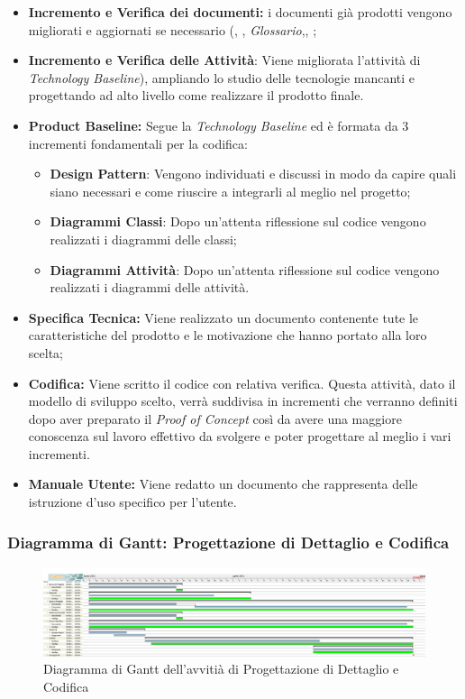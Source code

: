 \begin{itemize}
    \item \textbf{Incremento e Verifica dei documenti:} i documenti già prodotti vengono migliorati e aggiornati se necessario (\textit{\NdP}, \textit{\PdP}, \textit{Glossario},\textit{\PdQ}, \textit{\AdR}; 
    \item \textbf{Incremento e Verifica delle Attività}: Viene migliorata l'attività di \textit{Technology Baseline}), ampliando lo studio delle tecnologie mancanti e progettando ad alto livello come realizzare il prodotto finale.
    \item \textbf{Product Baseline:} Segue la \textit{Technology Baseline} ed è formata da 3 incrementi fondamentali per la codifica:
        \begin{itemize}
            \item \textbf{Design Pattern}: Vengono individuati e discussi in modo da capire quali siano necessari e come riuscire a integrarli al meglio nel progetto;
            \item \textbf{Diagrammi Classi}: Dopo un'attenta riflessione sul codice vengono realizzati i diagrammi delle classi;
            \item \textbf{Diagrammi Attività}: Dopo un'attenta riflessione sul codice vengono realizzati i diagrammi delle attività. 
        \end{itemize} 
    \item \textbf{Specifica Tecnica:} Viene realizzato un documento contenente tute le caratteristiche del prodotto e le motivazione che hanno portato alla loro scelta;
    \item \textbf{Codifica:} Viene scritto il codice con relativa verifica. Questa attività, dato il modello di sviluppo scelto, verrà suddivisa in incrementi che verranno definiti dopo aver preparato il \textit{Proof of Concept} così da avere una maggiore conoscenza sul lavoro effettivo da svolgere e poter progettare al meglio i vari incrementi.  
    \item \textbf{Manuale Utente:} Viene redatto un documento che rappresenta delle istruzione d'uso specifico per l'utente.
\end{itemize}

\newpage
\subsubsection{Diagramma di Gantt: Progettazione di Dettaglio e Codifica}
\begin{figure}[ht]
    \centering
    \includegraphics[width=\textwidth]{../../Immagini/GanttProgettazioneDiDettaglioECodifica}
    \caption{Diagramma di Gantt dell'avvitià di Progettazione di Dettaglio e Codifica}
\end{figure}